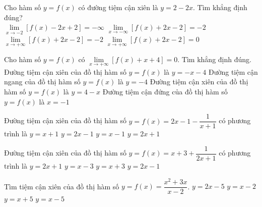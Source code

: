 \begin{ex}
	Cho hàm số $y=f(x)$ có đường tiệm cận xiên là $y=2 - 2 x$. Tìm khẳng định đúng?\\ 
	\choice
	{ $\mathop{\lim}\limits_{x \to  -2} {[f(x) - 2 x + 2]}=-\infty$ }
	{ $\mathop{\lim}\limits_{x \to  -\infty} {[f(x) + 2 x - 2]}=-2$ }
	{ $\mathop{\lim}\limits_{x \to  +\infty} {[f(x) + 2 x - 2]}=-2$ }
	{ \True $\mathop{\lim}\limits_{x \to  +\infty} {[f(x) + 2 x - 2]}=0$ }
	\loigiai{ 
		
}\end{ex}
\begin{ex}
	Cho hàm số $y=f(x)$ có $\mathop{\lim}\limits_{x \to  +\infty} {[f(x) + x + 4]}=0$. Tìm khẳng định đúng.
	\choice
	{ \True Đường tiệm cận xiên của đồ thị hàm số $y=f(x)$ là $y=- x - 4$ }
	{ Đường tiệm cận ngang của đồ thị hàm số $y=f(x)$ là $y=-4$ }
	{ Đường tiệm cận xiên của đồ thị hàm số $y=f(x)$ là $y=4 - x$ }
	{ Đường tiệm cận đứng của đồ thị hàm số $y=f(x)$ là $x=-1$ }
	\loigiai{ 
		
}\end{ex}
\begin{ex}
	Đường tiệm cận xiên của đồ thị hàm số $y=f(x)=2x-1-\dfrac{1}{x+1}$ có phương trình là
	\choice
	{$y=x+1$}
	{\True $y=2x-1$}
	{$y=x-1$}
	{$y=2x+1$}
\end{ex}
\begin{ex}
	Đường tiệm cận xiên của đồ thị hàm số $y=f(x)=x+3+\dfrac{1}{2x+1}$ có phương trình là
	\choice
	{$y=2x+1$}
	{$y=x-3$}
	{\True $y=x+3$}
	{$y=2x-1$}
\end{ex}
\begin{ex}
	Tìm tiệm cận xiên của đồ thị hàm số $y=f(x)=\dfrac{x^2+3x}{x-2}$.
	\choice
	{$y=2x-5$}
	{$y=x-2$}
	{\True $y=x+5$}
	{$y=x-5$}
\end{ex}
